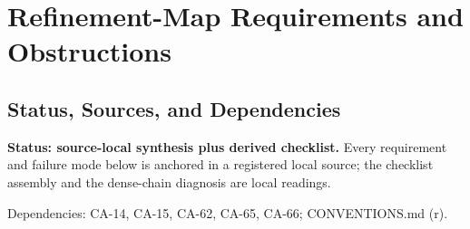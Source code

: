 
\section{Refinement-Map Requirements and Obstructions}
\label{sec:refinement-requirements-obstructions}

\subsection{Status, Sources, and Dependencies}

\textbf{Status: source-local synthesis plus derived checklist.}  Every
requirement and failure mode below is anchored in a registered local source;
the checklist assembly and the dense-chain diagnosis are local readings.

Dependencies: CA-14, CA-15, CA-62, CA-65, CA-66; CONVENTIONS.md (r).

